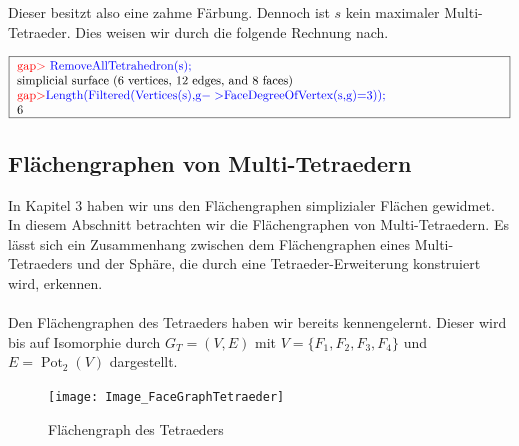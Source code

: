 \documentclass[12pt,titlepage,twoside,cleardoublepage]{article}
\theoremstyle{nummermitklammern}
\numberwithin{equation}{section}
\DeclareMathOperator{\Pot}{Pot}
\begin{document}
Dieser besitzt also eine zahme Färbung. Dennoch ist $s$ kein maximaler Multi-Tetraeder. Dies weisen wir durch die folgende Rechnung nach.
\begin{center}
$\fbox{
\parbox{14cm}{
\textcolor{red}{gap$>$} \textcolor{blue}{RemoveAllTetrahedron(s);}\newline
simplicial surface (6 vertices, 12 edges, and 8 faces)\newline
\textcolor{red}{gap$>$}\textcolor{blue}{ Length(Filtered(Vertices(s),g$->$FaceDegreeOfVertex(s,g)=3));}\newline
6
}}$
\end{center}
\subsection{Flächengraphen von Multi-Tetraedern}\label{factet}
In Kapitel 3 haben wir uns den Flächengraphen simplizialer Flächen gewidmet. In diesem Abschnitt betrachten wir die Flächengraphen von Multi-Tetraedern. Es lässt sich ein Zusammenhang zwischen dem Flächengraphen eines Multi-Tetraeders und der Sphäre, die durch eine Tetraeder-Erweiterung konstruiert wird, erkennen.\\\\
Den Flächengraphen des Tetraeders haben wir bereits kennengelernt. Dieser wird bis auf Isomorphie durch $G_T=(V,E)$ mit $V=\{F_1,F_2,F_3,F_4\}$ und $E=\Pot_2(V)$ dargestellt.
\begin{figure}[H]
\begin{center}
\texttt{[image: Image\_FaceGraphTetraeder]}
\end{center}
\caption{Flächengraph des Tetraeders}
\end{figure}
\end{document}
